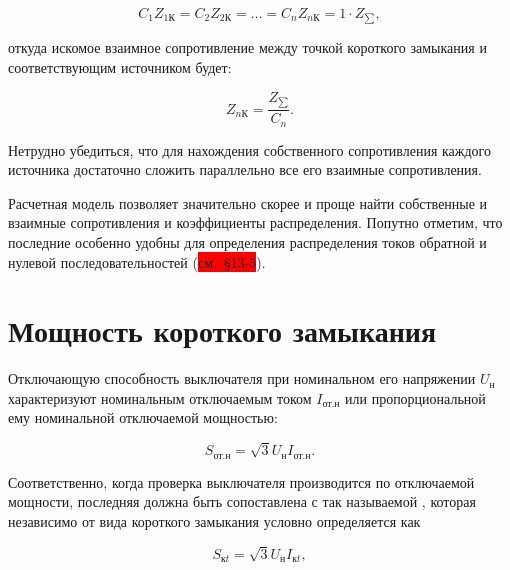 \begin{equation*}
	C_1 Z_{1\text{К}} = C_2 Z_{2\text{К}} = \ldots = C_n Z_{n\text{К}} = 1 \cdot Z_{\sum},
\end{equation*}	

откуда искомое взаимное сопротивление между точкой короткого замыкания и соответствующим источником будет:

\begin{equation}
	Z_{n\text{К}} = \frac{Z_{\sum}}{C_n}.
	\label{eq:2-37 Z_nK}
\end{equation}	

Нетрудно убедиться, что для нахождения собственного сопротивления каждого источника достаточно сложить параллельно все его взаимные сопротивления.

Расчетная модель позволяет значительно скорее и проще найти собственные и взаимные сопротивления и коэффициенты распределения. Попутно отметим, что последние особенно удобны для определения распределения токов обратной и нулевой последовательностей (\colorbox{red}{см.~§13-5}).

















\section{Мощность короткого замыкания}
\label{sec:2-7 moshchnost korotkogo zamykaniia}

Отключающую способность выключателя при номинальном его напряжении $ U_{\text{н}} $ характеризуют номинальным отключаемым током $ I_{\text{от.н}} $ или пропорциональной ему номинальной отключаемой мощностью:

\begin{equation*}
	S_{\text{от.н}} = \sqrt{3}U_{\text{н}}I_{\text{от.н}}.
\end{equation*}

Соответственно, когда проверка выключателя производится по отключаемой мощности, последняя должна быть сопоставлена с так называемой , которая независимо от вида короткого замыкания условно определяется как

\begin{equation} %
	\label{eq:2-38 S_kz_v_moment_t}
	S_{\text{к}t} = \sqrt{3}U_{\text{н}}I_{\text{к}t},
\end{equation}

